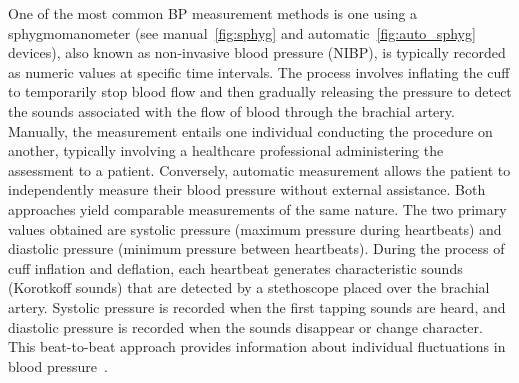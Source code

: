One of the most common BP measurement methods is one using a sphygmomanometer (see manual~\ref{fig:sphyg} and automatic~\ref{fig:auto_sphyg} devices), also known as non-invasive blood pressure (NIBP), is typically recorded as numeric values at specific time intervals.
The process involves inflating the cuff to temporarily stop blood flow and then gradually releasing the pressure to detect the sounds associated with the flow of blood through the brachial artery.
Manually, the measurement entails one individual conducting the procedure on another, typically involving a healthcare professional administering the assessment to a patient.
Conversely, automatic measurement allows the patient to independently measure their blood pressure without external assistance.
Both approaches yield comparable measurements of the same nature.
The two primary values obtained are systolic pressure (maximum pressure during heartbeats) and diastolic pressure (minimum pressure between heartbeats).
During the process of cuff inflation and deflation, each heartbeat generates characteristic sounds (Korotkoff sounds) that are detected by a stethoscope placed over the brachial artery.
Systolic pressure is recorded when the first tapping sounds are heard, and diastolic pressure is recorded when the sounds disappear or change character.
This beat-to-beat approach provides information about individual fluctuations in blood pressure~\cite{betts20BloodFlow2022}.

